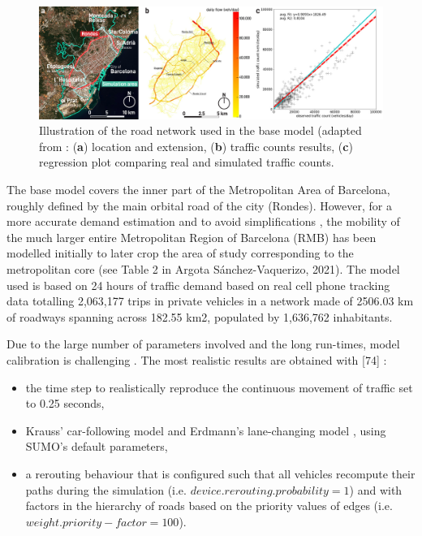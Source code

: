\begin{figure}[htbp!]
    \centering
    \includegraphics[width=1\textwidth]{LCBM_fig02.jpg}
    \caption{Illustration of the road network used in the base model (adapted from \citep{ArgotaSanchez-Vaquerizo2021}: (\textbf{a}) location and extension, (\textbf{b}) traffic counts results, (\textbf{c}) regression plot comparing real and simulated traffic counts.}
   \label{fig:LCBM_fig02}
\end{figure}

The base model covers the inner part of the Metropolitan Area of Barcelona, roughly defined by the main orbital road of the city (Rondes). However, for a more accurate demand estimation and to avoid simplifications \citep{Tilg2020,Schweizer2021}, the mobility of the much larger entire Metropolitan Region of Barcelona (RMB) has been modelled initially to later crop the area of study corresponding to the metropolitan core (see Table 2 in Argota Sánchez-Vaquerizo, 2021). The model used is based on 24 hours of traffic demand based on real cell phone tracking data totalling 2,063,177 trips in private vehicles in a network made of 2506.03 km of roadways spanning across 182.55 km2, populated by 1,636,762 inhabitants.

Due to the large number of parameters involved and the long run-times, model calibration is challenging \citep{alma990009089600205503}.  The most realistic results are obtained with [74] \citep{ArgotaSanchez-Vaquerizo2021}:
\begin{itemize}
    \item the time step to realistically reproduce the continuous movement of traffic \citep{Lieberman1996} set to 0.25 seconds,
    \item Krauss’ car-following model \citep{Krauss1997} and Erdmann’s lane-changing model \citep{Erdmann2015}, using SUMO’s default parameters,
    \item a rerouting behaviour that is configured such that all vehicles recompute their paths during the simulation (i.e. $device.rerouting.probability = 1$) and with factors in the hierarchy of roads based on the priority values of edges (i.e. $weight.priority-factor = 100$).
\end{itemize}

